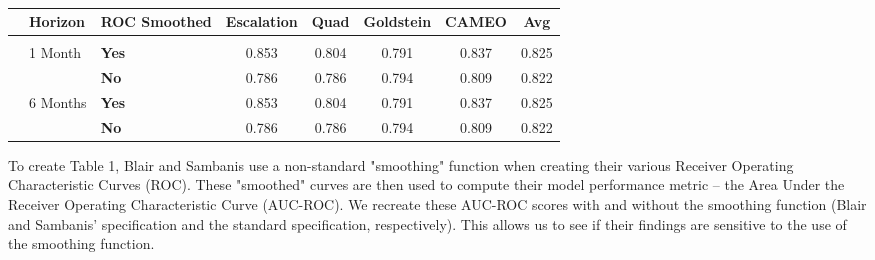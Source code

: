\begin{table}

\begin{threeparttable}
\caption{\label{tab:tab-1}}
\centering
\begin{tabular}[t]{ll>{\bfseries}lccccc}
\toprule
 & Horizon & ROC Smoothed & Escalation & Quad & Goldstein & CAMEO & Avg\\
\midrule
\addlinespace[0.3em]
\multicolumn{8}{l}{\textbf{Base Specification}}\\
\addlinespace[0.3em]
\hspace{1em} & 1 Month & Yes & 0.853 & 0.804 & 0.791 & 0.837 & 0.825\\
\cmidrule{3-8}
\hspace{1em}\hspace{1em} &  & No & 0.786 & 0.786 & 0.794 & 0.809 & 0.822\\
\cmidrule{2-8}
\hspace{1em} & 6 Months & Yes & 0.853 & 0.804 & 0.791 & 0.837 & 0.825\\
\cmidrule{3-8}
 &  & No & 0.786 & 0.786 & 0.794 & 0.809 & 0.822\\
\bottomrule
\end{tabular}
\begin{tablenotes}
\small
\item [] To create Table 1, Blair and Sambanis use a non-standard "smoothing" function when creating their various Receiver Operating Characteristic Curves (ROC). These "smoothed" curves are then used to compute their model performance metric -- the Area Under the Receiver Operating Characteristic Curve (AUC-ROC). We recreate these AUC-ROC scores with and without the smoothing function (Blair and Sambanis' specification and the standard specification, respectively). This allows us to see if their findings are sensitive to the use of the smoothing function.
\end{tablenotes}
\end{threeparttable}
\end{table}
